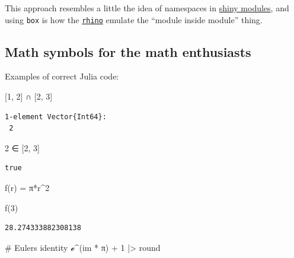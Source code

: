 \documentclass[
  letterpaper,
  DIV=11,
  numbers=noendperiod]{scrartcl}
\newenvironment{Shaded}{\begin{snugshade}}{\end{snugshade}}
\newcommand{\CommentTok}[1]{\textcolor[rgb]{0.37,0.37,0.37}{#1}}
\newcommand{\ConstantTok}[1]{\textcolor[rgb]{0.56,0.35,0.01}{#1}}
\newcommand{\FloatTok}[1]{\textcolor[rgb]{0.68,0.00,0.00}{#1}}
\newcommand{\FunctionTok}[1]{\textcolor[rgb]{0.28,0.35,0.67}{#1}}
\newcommand{\NormalTok}[1]{\textcolor[rgb]{0.00,0.23,0.31}{#1}}
\newcommand{\OperatorTok}[1]{\textcolor[rgb]{0.37,0.37,0.37}{#1}}
\begin{document}
This approach resembles a little the idea of namespaces in
\href{https://mastering-shiny.org/scaling-modules.html}{shiny modules},
and using \texttt{box} is how the
\href{https://appsilon.github.io/rhino/articles/explanation/box-modules.html}{\texttt{rhino}}
emulate the ``module inside module'' thing.

\subsection{Math symbols for the math
enthusiasts}\label{math-symbols-for-the-math-enthusiasts}

Examples of correct Julia code:

\begin{Shaded}
\begin{Highlighting}[]
\NormalTok{[}\FloatTok{1}\NormalTok{, }\FloatTok{2}\NormalTok{] }\OperatorTok{∩}\NormalTok{ [}\FloatTok{2}\NormalTok{, }\FloatTok{3}\NormalTok{]}
\end{Highlighting}
\end{Shaded}

\begin{verbatim}
1-element Vector{Int64}:
 2
\end{verbatim}

\begin{Shaded}
\begin{Highlighting}[]
\FloatTok{2} \OperatorTok{∈}\NormalTok{ [}\FloatTok{2}\NormalTok{, }\FloatTok{3}\NormalTok{]}
\end{Highlighting}
\end{Shaded}

\begin{verbatim}
true
\end{verbatim}

\begin{Shaded}
\begin{Highlighting}[]
\FunctionTok{f}\NormalTok{(r) }\OperatorTok{=} \ConstantTok{π}\OperatorTok{*}\NormalTok{r}\OperatorTok{\^{}}\FloatTok{2}

\FunctionTok{f}\NormalTok{(}\FloatTok{3}\NormalTok{)}
\end{Highlighting}
\end{Shaded}

\begin{verbatim}
28.274333882308138
\end{verbatim}

\begin{Shaded}
\begin{Highlighting}[]
\CommentTok{\# Euler\textquotesingle{}s identity}
\ConstantTok{ℯ}\OperatorTok{\^{}}\NormalTok{(}\ConstantTok{im} \OperatorTok{*} \ConstantTok{π}\NormalTok{) }\OperatorTok{+} \FloatTok{1} \OperatorTok{|\textgreater{}}\NormalTok{ round}
\end{Highlighting}
\end{Shaded}
\end{document}

